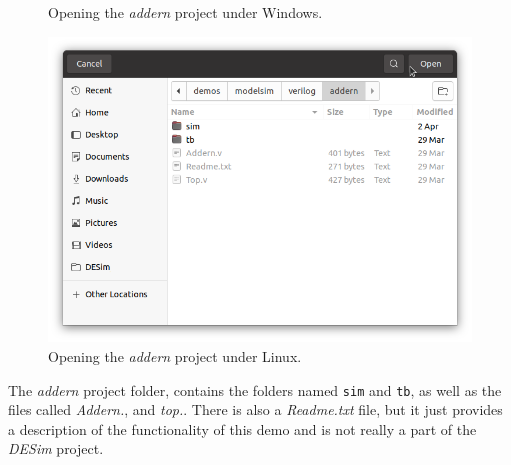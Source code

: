 \begin{figure}[h]
	\begin{center}
        \setlength{\fboxsep}{0pt}
	\end{center}
		  \caption{Opening the {\it addern} project under Windows.}
	\label{fig:open_windows}
\end{figure}

\begin{figure}[h]
	\begin{center}
        \setlength{\fboxsep}{0pt}
        \includegraphics[width = .75\textwidth]{figures/open_addern_linux.png}
	\end{center}
		  \caption{Opening the {\it addern} project under Linux.}
	\label{fig:open_linux}
\end{figure}

\clearpage
\newpage
The {\it addern} project folder, contains the 
folders named \texttt{sim} and \texttt{tb}, as well as the files called {\it Addern.\hdlFileExt}, 
and {\it top.\hdlFileExt}. There is also a {\it Readme.txt} file, but it just provides 
a description of the functionality of this demo and is not really a part of the {\it DESim} project. 

